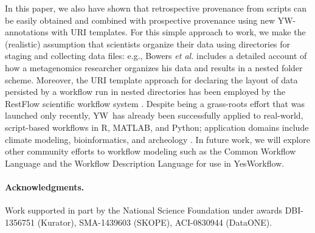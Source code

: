\documentclass[letterpaper,twocolumn,10pt]{article}
\newcommand{\YW}{\textsf{YesWorkflow}}
\newcommand{\yw}{\textsf{YW}}
\newcommand{\R}{\textsf{R}}
\newcommand{\MATLAB}{\textsf{MATLAB}}
\begin{document}
In this paper, we also have shown that retrospective provenance from
scripts can be easily obtained and combined with prospective
provenance using new \yw-annotations with URI templates. For this
simple approach to work, we make the (realistic) assumption that
scientists organize their data using directories for staging and
collecting data files: e.g., Bowers \emph{et al.}
\cite{bowers2007project} includes a detailed account of how a
metagenomics researcher organizes his data and results in a nested
folder scheme. Moreover, the URI template approach for declaring the
layout of data persisted by a workflow run in nested directories has
been employed by the RestFlow scientific workflow system
\cite{tsai2013autodrug}.
Despite being a grass-roots effort that was launched only recently,
\yw\ has already been successfully applied to real-world, script-based
workflows in \R, \MATLAB, and Python; application domains include
climate modeling, bioinformatics, and archeology
\cite{mcphillips2015ywIJDC}.
In future work, we will explore other community efforts to workflow
modeling such as the Common Workflow Language \cite{amstutz15CDL} and
the Workflow Description Language \cite{frazer15WDL} for use in \YW.

\paragraph{Acknowledgments.}
Work supported in part by the National Science Foundation under awards
DBI-1356751 (Kurator), SMA-1439603 (SKOPE), ACI-0830944 (DataONE).


\footnotesize

\end{document}
